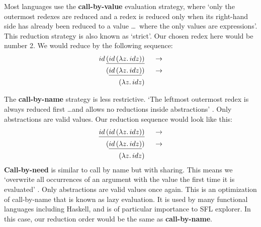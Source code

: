\noindent Most languages use the \textbf{call-by-value} evaluation strategy, where `only the outermost redexes are reduced and a redex is reduced only when its right-hand side has already been reduced to a value \ldots\ where the only values are \lambda expressions'\cite{pierce2002types}. This reduction strategy is also known as `strict'. Our chosen redex here would be number 2. We would reduce by the following sequence:
\begin{alignat*}{2}
id\,\underline{(id\,(\lambda z.\, id z))}  && \;\;\rightarrow\\ 
(\underline{id\,(\lambda z.\, id z)})      && \;\;\rightarrow\\ 
(\lambda z.\, id z)                        && \;\;\\ 
\end{alignat*}

\noindent The \textbf{call-by-name} strategy is less restrictive. `The leftmost outermost redex is always reduced first \ldots and allows no reductions inside abstractions' \cite{pierce2002types}. Only abstractions are valid values. Our reduction sequence would look like this:
\begin{alignat*}{2}
\underline{id\,(id\,(\lambda z.\, id z))}  && \;\;\rightarrow\\ 
(\underline{id\,(\lambda z.\, id z)})      && \;\;\rightarrow\\ 
(\lambda z.\, id z)                        && \;\;\\ 
\end{alignat*}
\noindent \textbf{Call-by-need} is similar to call by name but with sharing. This means we `overwrite all occurrences of an argument with the value the first time it is evaluated' \cite{pierce2002types}. Only abstractions are valid values once again. This is an optimization of call-by-name that is known as lazy evaluation. It is used by many functional languages including Haskell, and is of particular importance to SFL explorer. In this case, our reduction order would be the same as \textbf{call-by-name}. 


